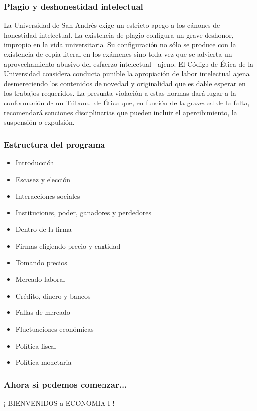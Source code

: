 \documentclass{beamer}
\begin{document}
\begin{frame}
    \frametitle{Plagio y deshonestidad intelectual}
    \justify
    \small{
    La Universidad de San Andrés exige un estricto apego a los cánones de honestidad intelectual. La existencia de plagio configura un grave deshonor, impropio en la vida universitaria. Su configuración no sólo se produce con la existencia de copia literal en los exámenes sino toda vez que se advierta un aprovechamiento abusivo del esfuerzo intelectual  - ajeno. El Código de Ética de la Universidad considera conducta punible la apropiación de labor intelectual ajena desmereciendo los contenidos de novedad y originalidad que es dable esperar en los trabajos requeridos. La presunta violación a estas normas dará lugar a la conformación de un Tribunal de Ética que, en función de la gravedad de la falta, recomendará sanciones disciplinarias que pueden incluir el apercibimiento, la suspensión o expulsión.}
\end{frame}

\begin{frame}
    \frametitle{Estructura del programa}
    \begin{itemize}
        \item Introducción
        \item Escasez y elección
        \item Interacciones sociales
        \item Instituciones, poder, ganadores y perdedores
        \item Dentro de la firma
        \item Firmas eligiendo precio y cantidad
        \item Tomando precios
        \item Mercado laboral
        \item Crédito, dinero y bancos
        \item Fallas de mercado
        \item Fluctuaciones económicas
        \item Política fiscal
        \item Política monetaria
    \end{itemize}
\end{frame}

\begin{frame}
    \frametitle{Ahora si podemos comenzar...}
    \centering
    \huge
    ¡ BIENVENIDOS a ECONOMIA I !
\end{frame}
\end{document}
